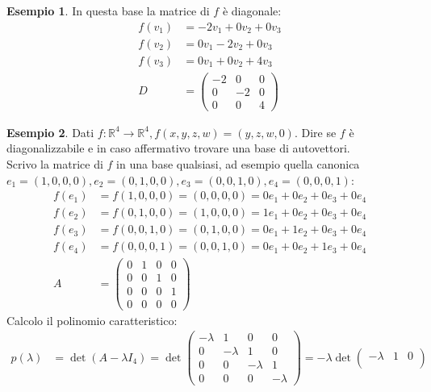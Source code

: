 \documentclass[a4paper]{article}
\theoremstyle{definition}
\newtheorem*{es}{Esempio}
\begin{document}
\begin{es}
		In questa base la matrice di $f$ è diagonale:
		\begin{align*}
			f(v_1) &= - 2v_1 + 0v_2 + 0v_3 \\
			f(v_2) &= 0v_1 - 2v_2 + 0v_3 \\
			f(v_3) &= 0v_1 + 0v_2 + 4v_3 \\
			D &= \begin{pmatrix}
				-2 & 0 & 0 \\
				0 & -2 & 0 \\
				0 & 0 & 4
			\end{pmatrix}
		\end{align*}
	\end{es}

	\begin{es}
		Dati $f: \mathbb{R}^4 \to \mathbb{R}^4, f(x, y, z, w) = (y, z, w, 0)$.
		Dire se $f$ è diagonalizzabile e in caso affermativo trovare una base di autovettori. \\
		Scrivo la matrice di $f$ in una base qualsiasi, ad esempio quella canonica $e_1 = (1, 0, 0, 0), e_2 = (0, 1, 0, 0), e_3 = (0, 0, 1, 0), e_4 = (0, 0, 0, 1)$:
		\begin{align*}
			f(e_1) &= f(1, 0, 0, 0) = (0, 0, 0, 0) = 0e_1 + 0e_2 + 0e_3 + 0e_4 \\
			f(e_2) &= f(0, 1, 0, 0) = (1, 0, 0, 0) = 1e_1 + 0e_2 + 0e_3 + 0e_4 \\
			f(e_3) &= f(0, 0, 1, 0) = (0, 1, 0, 0) = 0e_1 + 1e_2 + 0e_3 + 0e_4 \\
			f(e_4) &= f(0, 0, 0, 1) = (0, 0, 1, 0) = 0e_1 + 0e_2 + 1e_3 + 0e_4 \\
			A &= \begin{pmatrix}
				0 & 1 & 0 & 0 \\
				0 & 0 & 1 & 0 \\
				0 & 0 & 0 & 1 \\
				0 & 0 & 0 & 0
			\end{pmatrix}
		\end{align*}
		Calcolo il polinomio caratteristico:
		\begin{align*}
			p(\lambda) &= \det(A - \lambda I_4) = \det \begin{pmatrix}
				- \lambda & 1 & 0 & 0 \\
				0 & - \lambda & 1 & 0 \\
				0 & 0 & - \lambda & 1 \\
				0 & 0 & 0 & - \lambda
			\end{pmatrix} = - \lambda \det \begin{pmatrix}
				- \lambda & 1 & 0 \\

\end{pmatrix}
\end{align*}
\end{es}
\end{document}
